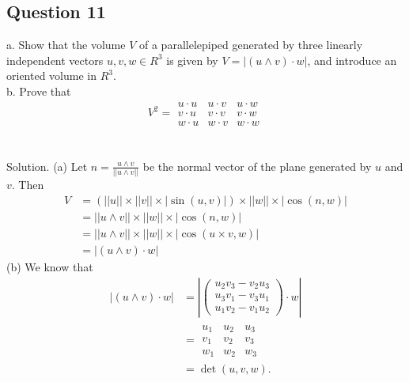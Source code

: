 \documentclass[12pt]{article}
\begin{document}
\subsection*{Question 11}
a. Show that the volume $V$ of a parallelepiped generated by three linearly independent vectors $u,v,w \in R^3$ is given by $V=|(u \wedge v)\cdot w|$, and introduce an oriented volume in $R^3$.\\
b. Prove that \begin{equation*}
     V^2 = \begin{array}{|ccc|}
     u \cdot u & u \cdot v & u \cdot w\\
     v \cdot u & v \cdot v & v \cdot w\\
     w \cdot u & w \cdot v & w \cdot w
     \end{array}
 \end{equation*}\\\\
Solution.
(a) Let $n = \frac{u \wedge v}{||u \wedge v||}$ be the normal vector of the plane generated by $u$ and $v$. Then \begin{align*}
     V &= (||u||\times||v||\times|\sin(u,v)|)\times||w||\times|\cos(n,w)|\\
     &= ||u\wedge v||\times||w||\times|\cos(n,w)|\\
     &= ||u\wedge v||\times||w||\times|\cos(u\times v,w)|\\
     &= |(u\wedge v)\cdot w|
 \end{align*}
(b) We know that \begin{align*}
     |(u\wedge v)\cdot w| &= |\begin{pmatrix}
     u_2v_3-v_2u_3\\
     u_3v_1-v_3u_1\\
     u_1v_2-v_1u_2
     \end{pmatrix}\cdot w|\\
     &=\begin{array}{|ccc|}
     u_1 & u_2 & u_3\\
     v_1 & v_2 & v_3\\
     w_1 & w_2 & w_3
     \end{array}\\
     &=\det (u,v,w).
 \end{align*}
\end{document}
